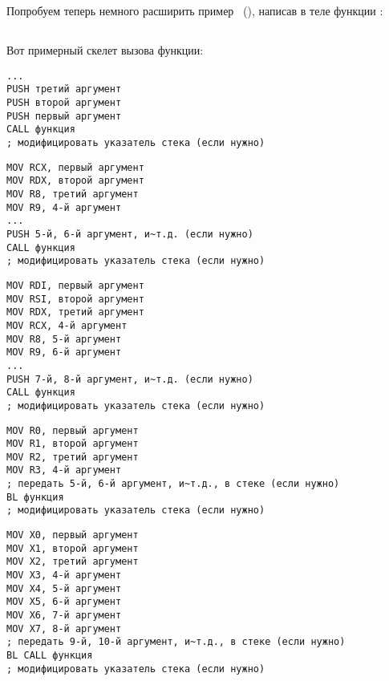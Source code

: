 \section{\PrintfSeveralArgumentsSectionName}

Попробуем теперь немного расширить пример \IT{\HelloWorldSectionName}~(),
написав в теле функции \main:







\subsection{\Conclusion{}}

Вот примерный скелет вызова функции:

\begin{lstlisting}[caption=x86]
...
PUSH третий аргумент
PUSH второй аргумент
PUSH первый аргумент
CALL функция
; модифицировать указатель стека (если нужно)
\end{lstlisting}

\begin{lstlisting}[caption=x64 (MSVC)]
MOV RCX, первый аргумент
MOV RDX, второй аргумент
MOV R8, третий аргумент
MOV R9, 4-й аргумент
...
PUSH 5-й, 6-й аргумент, и~т.д. (если нужно)
CALL функция
; модифицировать указатель стека (если нужно)
\end{lstlisting}

\begin{lstlisting}[caption=x64 (GCC)]
MOV RDI, первый аргумент
MOV RSI, второй аргумент
MOV RDX, третий аргумент
MOV RCX, 4-й аргумент
MOV R8, 5-й аргумент
MOV R9, 6-й аргумент
...
PUSH 7-й, 8-й аргумент, и~т.д. (если нужно)
CALL функция
; модифицировать указатель стека (если нужно)
\end{lstlisting}

\begin{lstlisting}[caption=ARM]
MOV R0, первый аргумент
MOV R1, второй аргумент
MOV R2, третий аргумент
MOV R3, 4-й аргумент
; передать 5-й, 6-й аргумент, и~т.д., в стеке (если нужно)
BL функция
; модифицировать указатель стека (если нужно)
\end{lstlisting}

\begin{lstlisting}[caption=ARM64]
MOV X0, первый аргумент
MOV X1, второй аргумент
MOV X2, третий аргумент
MOV X3, 4-й аргумент
MOV X4, 5-й аргумент
MOV X5, 6-й аргумент
MOV X6, 7-й аргумент
MOV X7, 8-й аргумент
; передать 9-й, 10-й аргумент, и~т.д., в стеке (если нужно)
BL CALL функция
; модифицировать указатель стека (если нужно)
\end{lstlisting}

